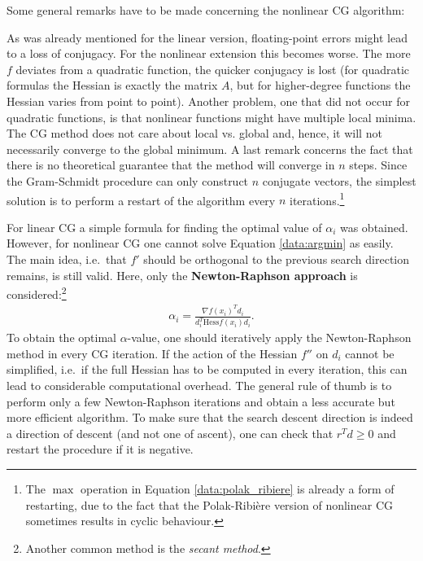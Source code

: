     Some general remarks have to be made concerning the nonlinear CG algorithm:
    \begin{remark}
        As was already mentioned for the linear version, floating-point errors might lead to a loss of conjugacy. For the nonlinear extension this becomes worse. The more $f$ deviates from a quadratic function, the quicker conjugacy is lost (for quadratic formulas the Hessian is exactly the matrix $A$, but for higher-degree functions the Hessian varies from point to point). Another problem, one that did not occur for quadratic functions, is that nonlinear functions might have multiple local minima. The CG method does not care about local vs. global and, hence, it will not necessarily converge to the global minimum. A last remark concerns the fact that there is no theoretical guarantee that the method will converge in $n$ steps. Since the Gram-Schmidt procedure can only construct $n$ conjugate vectors, the simplest solution is to perform a restart of the algorithm every $n$ iterations.\footnote{The $\max$ operation in Equation \eqref{data:polak_ribiere} is already a form of restarting, due to the fact that the Polak-Ribi\`ere version of nonlinear CG sometimes results in cyclic behaviour.}
    \end{remark}

    For linear CG a simple formula for finding the optimal value of $\alpha_i$ was obtained. However, for nonlinear CG one cannot solve Equation \eqref{data:argmin} as easily. The main idea, i.e.~that $f'$ should be orthogonal to the previous search direction remains, is still valid. Here, only the \textbf{Newton-Raphson approach} is considered:\footnote{Another common method is the \textit{secant method}.}
    \begin{gather}
        \alpha_i = \frac{\nabla f(x_i)^Td_i}{d_i^T\mathrm{Hess}f(x_i)d_i}.
    \end{gather}
    To obtain the optimal $\alpha$-value, one should iteratively apply the Newton-Raphson method in every CG iteration. If the action of the Hessian $f''$ on $d_i$ cannot be simplified, i.e.~if the full Hessian has to be computed in every iteration, this can lead to considerable computational overhead. The general rule of thumb is to perform only a few Newton-Raphson iterations and obtain a less accurate but more efficient algorithm. To make sure that the search descent direction is indeed a direction of descent (and not one of ascent), one can check that $r^Td\geq0$ and restart the procedure if it is negative.

